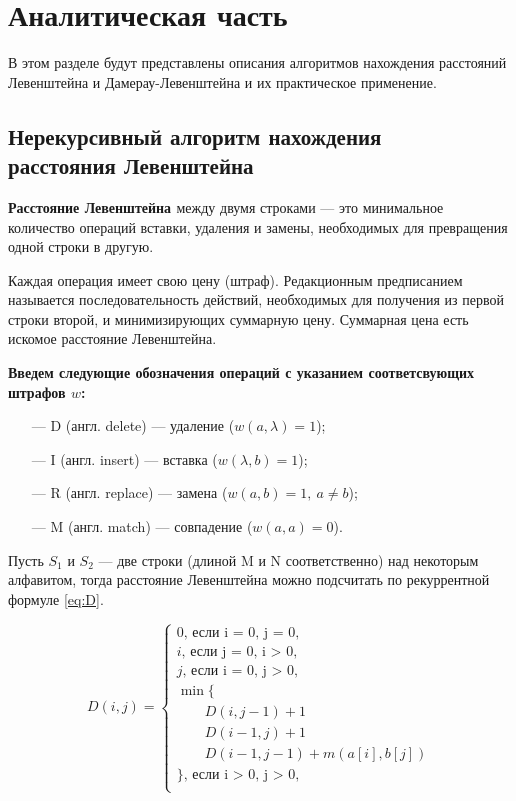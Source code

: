 \chapter{Аналитическая часть}
В этом разделе будут представлены описания алгоритмов нахождения расстояний Левенштейна и Дамерау-Левенштейна и их практическое применение.

\section{Нерекурсивный алгоритм нахождения \\расстояния Левенштейна}

\textbf{Расстояние Левенштейна \cite{Levenshtein}} между двумя строками --- это минимальное количество операций вставки, удаления и замены, необходимых для превращения одной строки в другую.

Каждая операция имеет свою цену (штраф). Редакционным предписанием называется последовательность действий, необходимых для получения из первой строки второй, и минимизирующих суммарную цену. Суммарная цена есть искомое расстояние Левенштейна.

\bigskip

\textbf{Введем следующие обозначения операций с указанием соответсвующих штрафов $w$:} 
\begin{itemize}
	\item[---] D (англ. delete) --- удаление ($w(a,\lambda)=1$);
	\item[---] I (англ. insert) --- вставка ($w(\lambda,b)=1$);
	\item[---] R (англ. replace) --- замена  ($w(a,b)=1, \medspace a \neq b$);
	\item[---] M (англ. match) --- совпадение ($w(a,a)=0$).
\end{itemize}

Пусть $S_{1}$ и $S_{2}$ --- две строки (длиной M и N соответственно) над некоторым алфавитом, тогда расстояние Левенштейна можно подсчитать по рекуррентной формуле \ref{eq:D}.

\begin{equation}
	\label{eq:D}
	D(i, j) = \begin{cases}
		
		0 \text{, если i = 0, j = 0,}\\
		i \text{, если j = 0, i > 0,}\\
		j \text{, если i = 0, j > 0,}\\
		\min \lbrace \\
		\qquad D(i, j-1) + 1\\
		\qquad D(i-1, j) + 1\\
		\qquad D(i-1, j-1) + m(a[i], b[j]) \\
		\rbrace \text{, если i > 0, j > 0,}\\
	\end{cases}
\end{equation}

